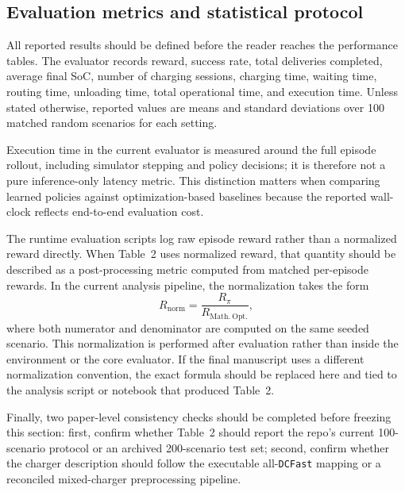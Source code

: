 \subsection{Evaluation metrics and statistical protocol}
\label{sec:evaluation-metrics}

All reported results should be defined before the reader reaches the performance tables. The evaluator records reward, success rate, total deliveries completed, average final SoC, number of charging sessions, charging time, waiting time, routing time, unloading time, total operational time, and execution time. Unless stated otherwise, reported values are means and standard deviations over 100 matched random scenarios for each setting.

Execution time in the current evaluator is measured around the full episode rollout, including simulator stepping and policy decisions; it is therefore not a pure inference-only latency metric. This distinction matters when comparing learned policies against optimization-based baselines because the reported wall-clock reflects end-to-end evaluation cost.

The runtime evaluation scripts log raw episode reward rather than a normalized reward directly. When Table~2 uses normalized reward, that quantity should be described as a post-processing metric computed from matched per-episode rewards. In the current analysis pipeline, the normalization takes the form
\[
R_{\mathrm{norm}} = \frac{R_{\pi}}{R_{\mathrm{Math.\ Opt.}}},
\]
where both numerator and denominator are computed on the same seeded scenario. This normalization is performed after evaluation rather than inside the environment or the core evaluator. If the final manuscript uses a different normalization convention, the exact formula should be replaced here and tied to the analysis script or notebook that produced Table~2.

Finally, two paper-level consistency checks should be completed before freezing this section: first, confirm whether Table~2 should report the repo's current 100-scenario protocol or an archived 200-scenario test set; second, confirm whether the charger description should follow the executable all-\texttt{DCFast} mapping or a reconciled mixed-charger preprocessing pipeline.
